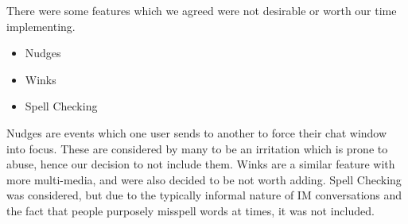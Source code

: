 There were some features which we agreed were not desirable or worth our time implementing.

\begin{itemize}

\item{Nudges}
\item{Winks}
\item{Spell Checking}

\end{itemize}

Nudges are events which one user sends to another to force their chat window into focus. These are considered by many to be an irritation which is prone to abuse, hence our decision to not include them. Winks are a similar feature with more multi-media, and were also decided to be not worth adding. Spell Checking was considered, but due to the typically informal nature of IM conversations and the fact that people purposely misspell words at times, it was not included.
